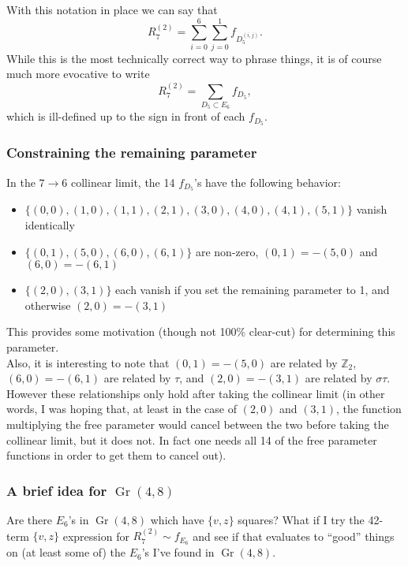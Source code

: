 \documentclass[12pt]{article}
\DeclareMathOperator{\Gr}{Gr}
\def\fd5{f_{D_5}}
\def\d5{D_5}
\def\e6{E_6}
\def\r27{R^{(2)}_7}
\begin{document}
With this notation in place we can say that 
\begin{equation}
	\r27 = \sum_{i=0}^{6}\sum_{j=0}^{1} f_{D_5^{(i,j)}}.
\end{equation}
While this is the most technically correct way to phrase things, it is of course much more evocative to write
\begin{equation}
	\r27 = \sum_{\d5\subset\e6} f_{D_5},
\end{equation}
which is ill-defined up to the sign in front of each $\fd5$. 


\subsubsection*{Constraining the remaining parameter}

In the $7\to6$ collinear limit, the 14 $\fd5$'s have the following behavior:

\begin{itemize}
	\item $\{(0, 0), (1, 0), (1, 1), (2, 1), (3, 0), (4, 0), (4, 1), (5, 1)\}$ vanish identically
	\item $\{(0, 1), (5, 0), (6, 0), (6, 1)\}$ are non-zero, $(0, 1)=-(5, 0)$ and $(6, 0)=-(6, 1)$
	\item $\{(2, 0), (3, 1)\}$ each vanish if you set the remaining parameter to 1, and otherwise $(2, 0)=-(3, 1)$
\end{itemize}
This provides some motivation (though not 100\% clear-cut) for determining this parameter. \\

Also, it is interesting to note that $(0, 1)=-(5, 0)$ are related by $\mathbb{Z}_2$, $(6, 0)=-(6, 1)$ are related by $\tau$, and $(2, 0)=-(3, 1)$ are related by $\sigma\tau$. However these relationships only hold after taking the collinear limit (in other words, I was hoping that, at least in the case of $(2, 0)$ and $(3, 1)$, the function multiplying the free parameter would cancel between the two before taking the collinear limit, but it does not. In fact one needs all 14 of the free parameter functions in order to get them to cancel out).\\

\subsubsection*{A brief idea for $\Gr(4,8)$}

Are there $\e6$'s in $\Gr(4,8)$ which have $\{v,z\}$ squares? What if I try the 42-term $\{v,z\}$ expression for $\r27 \sim f_{E_6}$ and see if that evaluates to ``good'' things on (at least some of) the $\e6$'s I've found in $\Gr(4,8)$.
\end{document}
